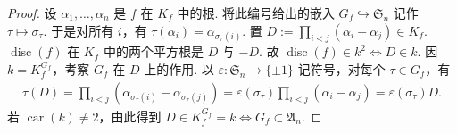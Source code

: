 \begin{proof}设 $\alpha_1,\ldots,\alpha_n$ 是 $f$ 在 $K_f$ 中的根. 将此编号给出的嵌入 $G_f\hookrightarrow\mathfrak S_n$ 记作 $\tau\mapsto\sigma_\tau$. 于是对所有 $i$，有 $\tau(\alpha_i)=\alpha_{\sigma_\tau(i)}$.
置 $D:=\prod_{i<j}(\alpha_i-\alpha_j)\in K_f$. $\operatorname{disc}(f)$ 在 $K_f$ 中的两个平方根是 $D$ 与 $-D$. 故 $\operatorname{disc}(f)\in k^2\Longleftrightarrow D\in k$. 因 $k=K_f^{G_f}$，考察 $G_f$ 在 $D$ 上的作用. 以 $\varepsilon:\mathfrak S_n\to\{\pm1\}$ 记符号，对每个 $\tau\in G_f$，有
\begin{align*}
\tau(D)=\prod_{i<j}(\alpha_{\sigma_\tau(i)}-\alpha_{\sigma_\tau(j)})=\varepsilon(\sigma_\tau)\prod_{i<j}(\alpha_i-\alpha_j)=\varepsilon(\sigma_\tau)D.
\end{align*}
若 $\operatorname{car}(k)\ne2$，由此得到 $D\in K_f^{G_f}=k\Longleftrightarrow G_f\subset\mathfrak A_n$.\end{proof}
